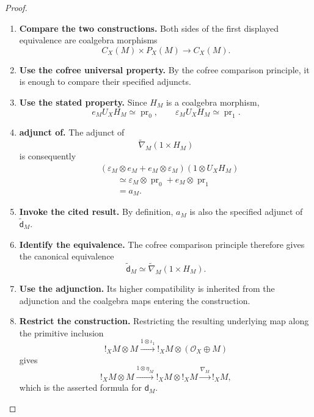 \begin{proof}
\leavevmode
\begin{enumerate}[label=\textup{(\arabic*)}]
    \item \textbf{Compare the two constructions.}
    Both sides of the first displayed equivalence are coalgebra morphisms
    \[
        C_X(M)\times P_X(M)
        \longrightarrow
        C_X(M).
    \]

    \item \textbf{Use the cofree universal property.}
    By the cofree comparison principle, it is enough to compare their specified adjuncts.

    \item \textbf{Use the stated property.}
    Since \(H_M\) is a coalgebra morphism,
    \[
        e_MU_XH_M\simeq\operatorname{pr}_0,
        \qquad
        \varepsilon_MU_XH_M\simeq\operatorname{pr}_1.
    \]

    \item \textbf{adjunct of.}
    The adjunct of
    \[
        \widetilde\nabla_M(1\times H_M)
    \]
    is consequently
    \[
    \begin{aligned}
        &(\varepsilon_M\otimes e_M+e_M\otimes\varepsilon_M)
        (1\otimes U_XH_M)
        \\
        &\qquad\simeq
        \varepsilon_M\otimes\operatorname{pr}_0
        +
        e_M\otimes\operatorname{pr}_1
        \\
        &\qquad=
        a_M.
    \end{aligned}
    \]

    \item \textbf{Invoke the cited result.}
    By definition, \(a_M\) is also the specified adjunct of \(\widetilde{\mathsf d}_M\).

    \item \textbf{Identify the equivalence.}
    The cofree comparison principle therefore gives the canonical equivalence
    \[
        \widetilde{\mathsf d}_M
        \simeq
        \widetilde\nabla_M(1\times H_M).
    \]

    \item \textbf{Use the adjunction.}
    Its higher compatibility is inherited from the adjunction and the coalgebra maps entering
    the construction.

    \item \textbf{Restrict the construction.}
    Restricting the resulting underlying map along the primitive inclusion
    \[
        !_XM\otimes M
        \xrightarrow{1\otimes\iota_1}
        !_XM\otimes(\mathcal O_X\oplus M)
    \]
    gives
    \[
        !_XM\otimes M
        \xrightarrow{1\otimes\eta_M}
        !_XM\otimes !_XM
        \xrightarrow{\nabla_M}
        !_XM,
    \]
    which is the asserted formula for \(\mathsf d_M\).
\end{enumerate}
\end{proof}

